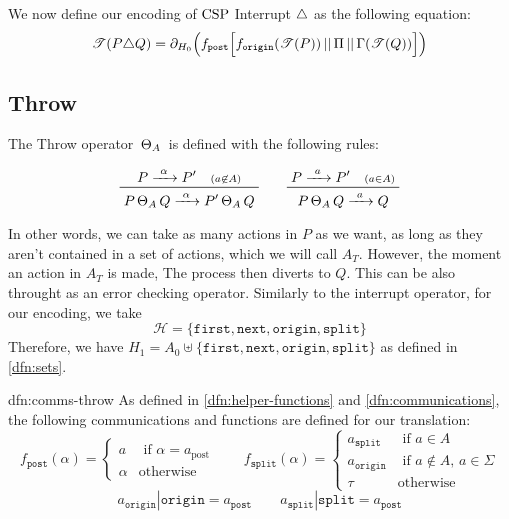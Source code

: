 \documentclass[../hons_project.tex]{subfiles}
\begin{document}
We now define our encoding of $\mathrm{CSP}$ Interrupt $\triangle$ as the following equation:
\[\mathscr{T}(P \triangle Q) = \partial_{H_{0}}\Bigl(f_{\mathtt{post}}\Bigl[ f_{\mathtt{origin}}(\mathscr{T}(P)) \,\vert\vert\, \Pi \,\vert\vert\, \Gamma(\mathscr{T}(Q)) \Bigr]\Bigr)\]
\subsection{Throw}\label{ssec:throw}

The Throw operator $\,\Theta_{A}\,$ is defined with the following rules:

\[\prftree{P \prightarrow{\alpha} P' \quad \scriptstyle(a\not\in A)}{P \throw Q \prightarrow{\alpha} P' \throw Q} \qquad \prftree{P \prightarrow{a} P' \quad \scriptstyle(a\in A)}{P \throw Q \prightarrow{a} Q }\]

In other words, we can take as many actions in $P$ as we want, as long as they aren't contained in a set of actions, which we will call $A_{T}$. However, the moment an action in $A_{T}$ is made, The process then diverts to $Q$. This can be also throught as an error checking operator. Similarly to the interrupt operator, for our encoding, we take
\[\mathscr{H} = \{\mathtt{first}, \mathtt{next}, \mathtt{origin}, \mathtt{split}\}\]
Therefore, we have $H_{1} = A_{0} \uplus \{\mathtt{first}, \mathtt{next}, \mathtt{origin}, \mathtt{split}\}$ as defined in \ref{dfn:sets}.

\begin{dfn}{dfn:comms-throw}{}
	As defined in \ref{dfn:helper-functions} and \ref{dfn:communications}, the following communications and functions are defined for our translation:
	\[f_{\mathtt{post}}(\alpha) = \begin{cases}
			a      & \text{ if } \alpha = a_{\mathrm{post}} \\
			\alpha & \text{otherwise}
		\end{cases} \qquad f_{\mathtt{split}}(\alpha) = \begin{cases}
			a_{\mathtt{split}}  & \text{ if } a\in A                    \\
			a_{\mathtt{origin}} & \text{ if } a\not\in A,\, a\in \Sigma \\
			\tau                & \mathrm{otherwise}
		\end{cases}\]
	\[a_{\mathtt{origin}} | \mathtt{origin} = a_{\mathtt{post}} \qquad a_{\mathtt{split}} | \mathtt{split} = a_{\mathtt{post}}\]
\end{dfn}
\end{document}
